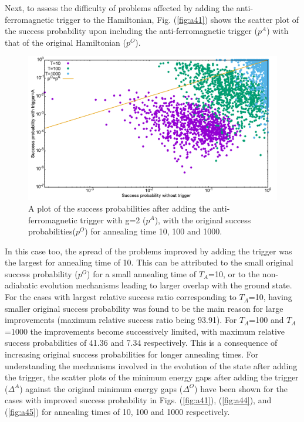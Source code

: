 \documentclass[../main.tex]{subfiles}
\begin{document}
Next, to assess the difficulty of problems affected by adding the anti-ferromagnetic trigger to the Hamiltonian, Fig. (\ref{fig:a41}) shows the scatter plot of the success probability upon including the anti-ferromagnetic trigger ($p^A$) with that of the original Hamiltonian ($p^O$). 


\begin{figure}[H]
\centering 
\includegraphics[scale=0.22]{ProbScat_g2.png}
\caption{A plot of the success probabilities after adding the anti-ferromagnetic trigger with g=2 ($p^A$), with the original success probabilities($p^O$) for annealing time 10, 100 and 1000.}
\label{fig:a40}
\end{figure}
In this case too, the spread of the problems improved by adding the trigger was the largest for annealing time of 10. This can be attributed to the small original success probability ($p^O$) for a small annealing time of $T_A$=10, or to the non-adiabatic evolution mechanisms leading to larger overlap with the ground state. For the cases with largest relative success ratio corresponding to $T_A$=10, having smaller original success probability was found to be the main reason for large improvements (maximum relative success ratio being 93.91). For $T_A$=100 and $T_A$=1000 the improvements become successively limited, with maximum relative success probabilities of 41.36 and 7.34 respectively. This is a consequence of increasing original success probabilities for longer annealing times. For understanding the mechanisms involved in the evolution of the state after adding the trigger, the scatter plots of the minimum energy gaps after adding the trigger ($\Delta^A$) against the original minimum energy gaps ($\Delta^O$) have been shown for the cases with improved success probability in Figs. (\ref{fig:a41}), (\ref{fig:a44}), and (\ref{fig:a45}) for annealing times of 10, 100 and 1000 respectively.\\
\end{document}

